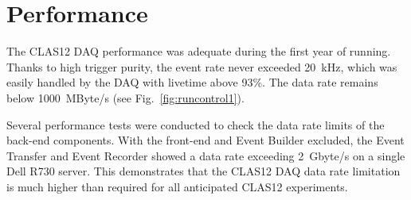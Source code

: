 \section{Performance}

The CLAS12 DAQ performance was adequate during the first year of running. Thanks to high trigger purity, the event
rate never exceeded 20~kHz, which was easily handled by the DAQ with livetime above 93\%. The data rate remains
below 1000~MByte/s (see Fig.~\ref{fig:runcontrol1}).

Several performance tests were conducted to check the data rate limits of the back-end components. With the
front-end and Event Builder excluded, the Event Transfer and Event Recorder showed a data rate exceeding
2~Gbyte/s on a single Dell R730 server. This demonstrates that the CLAS12 DAQ data rate limitation is much higher
than required for all anticipated CLAS12 experiments.

